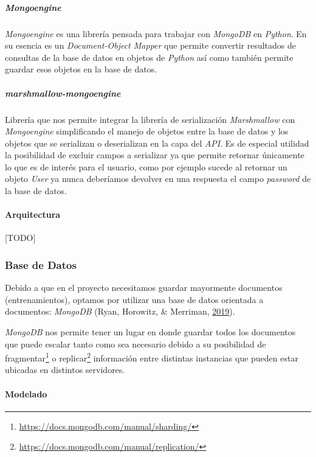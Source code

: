 \documentclass[12pt,a4paper,]{scrartcl}
\let\oldparagraph\paragraph
\renewcommand{\paragraph}[1]{\oldparagraph{#1}\mbox{}}
\let\oldsubparagraph\subparagraph
\renewcommand{\subparagraph}[1]{\oldsubparagraph{#1}\mbox{}}
\let\rmarkdownfootnote\footnote%
\def\footnote{\protect\rmarkdownfootnote}
\begin{document}
\hypertarget{mongoengine}{%
\subparagraph{\texorpdfstring{\emph{Mongoengine}}{Mongoengine}}\label{mongoengine}}

\emph{Mongoengine} es una librería pensada para trabajar con \emph{MongoDB} en \emph{Python}. En su esencia es un \emph{Document-Object Mapper} que permite convertir resultados de consultas de la base de datos en objetos de \emph{Python} así como también permite guardar esos objetos en la base de datos.

\hypertarget{marshmallow-mongoengine}{%
\subparagraph{\texorpdfstring{\emph{marshmallow-mongoengine}}{marshmallow-mongoengine}}\label{marshmallow-mongoengine}}

Librería que nos permite integrar la librería de serialización \emph{Marshmallow} con \emph{Mongoengine} simplificando el manejo de objetos entre la base de datos y los objetos que se serializan o deserializan en la capa del \emph{API}. Es de especial utilidad la posibilidad de excluir campos a serializar ya que permite retornar únicamente lo que es de interés para el usuario, como por ejemplo sucede al retornar un objeto \emph{User} ya nunca deberíamos devolver en una respuesta el campo \emph{password} de la base de datos.

\hypertarget{arquitectura-1}{%
\paragraph{Arquitectura}\label{arquitectura-1}}

{[}TODO{]}

\hypertarget{base-de-datos}{%
\subsubsection{Base de Datos}\label{base-de-datos}}

Debido a que en el proyecto necesitamos guardar mayormente documentos (entrenamientos), optamos por utilizar una base de datos orientada a documentos: \emph{MongoDB} (Ryan, Horowitz, \& Merriman, \protect\hyperlink{ref-mongodb}{2019}).

\emph{MongoDB} nos permite tener un lugar en donde guardar todos los documentos que puede escalar tanto como sea necesario debido a su posibilidad de fragmentar\footnote{\url{https://docs.mongodb.com/manual/sharding/}} o replicar\footnote{\url{https://docs.mongodb.com/manual/replication/}} información entre distintas instancias que pueden estar ubicadas en distintos servidores.

\hypertarget{modelado}{%
\paragraph{Modelado}\label{modelado}}
\end{document}
